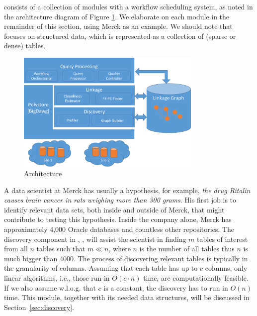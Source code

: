 \dcv consists of a collection of modules with a workflow scheduling system, as noted in the architecture diagram of Figure \ref{fig:arch}. We elaborate on each module in the remainder of this section, using Merck as an example.
We should note that \dcv focuses on structured data, which is represented as a collection of (sparse or dense) tables.


\begin{figure}[!t]
\includegraphics[width=3.5in]{arch3.pdf}
\caption{\dcv Architecture}
\label{fig:arch}
\end{figure}


\stitle{[Discovery.]} 
A data scientist at Merck has usually a hypothesis, for example, {\it the drug Ritalin causes brain cancer in rats weighing more than 300 grams}.
His first job is to identify relevant data sets, both inside and outside of Merck, that might contribute to testing this hypothesis. Inside the company alone, Merck has approximately 4,000 Oracle databases and countless other repositories. The discovery component in \dcv, , will assist the scientist in finding $m$ tables of interest from all $n$ tables such that $m \ll n$, where $n$ is the number of all tables thus $n$ is much bigger than 4000.  
%
The process of discovering relevant tables is typically in the granularity of columns. Assuming that each table has up to $c$ columns, only linear algorithms, i.e., those run in $O(c\cdot n)$ time, are computationally feasible. If we also assume w.l.o.g. that $c$ is a constant, the discovery has to run in $O(n)$ time.
%
This module, together with its needed data structures, will be discussed in Section~\ref{sec:discovery}.


